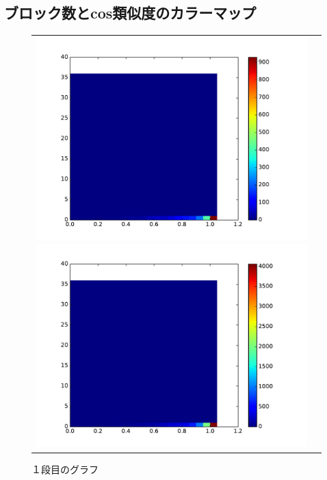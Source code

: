 \documentclass[twocolumn,9pt,a4paper]{jsarticle}
\begin{document}
\newpage
 \subsection{ブロック数とcos類似度のカラーマップ}
\begin{figure}[ht]
 \begin{tabular}{cc}
 	\begin{minipage}[t]{0.45\hsize}
	 \centering
	 \includegraphics[keepaspectratio, scale = 0.2]{colormap_block_1.pdf}
	 \caption{１段目のグラフ}
	 \label{first_splite}
	\end{minipage}
        \begin{minipage}[t]{0.45\hsize}
	 \centering
	 \includegraphics[keepaspectratio, scale = 0.2]{colormap_block_2.pdf}

\end{minipage}
\end{tabular}
\end{figure}
\end{document}
